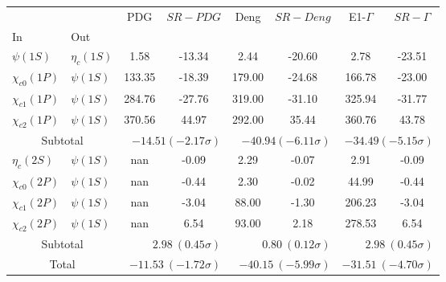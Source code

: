 \begin{tabular}{|l|l|c|c|c|c|c|c|}%
\hline%
&&PDG&$SR-PDG$&Deng&$SR-Deng$&E1-$\Gamma$&$SR-\Gamma$\\%
In&Out&&&&&&\\%
\hline%
$\psi(1S)$&$\eta_{c}(1S)$&1.58&-13.34&2.44&-20.60&2.78&-23.51\\%
$\chi_{c0}(1P)$&$\psi(1S)$&133.35&-18.39&179.00&-24.68&166.78&-23.00\\%
$\chi_{c1}(1P)$&$\psi(1S)$&284.76&-27.76&319.00&-31.10&325.94&-31.77\\%
$\chi_{c2}(1P)$&$\psi(1S)$&370.56&44.97&292.00&35.44&360.76&43.78\\%
\hline%
\hline%
\multicolumn{2}{|c|}{Subtotal}&\multicolumn{2}{|r|}{$-14.51 (-2.17\sigma)$}&\multicolumn{2}{|r|}{$-40.94 (-6.11\sigma)$}&\multicolumn{2}{|r|}{$-34.49 (-5.15\sigma)$}\\%
\hline%
\hline%
$\eta_{c}(2S)$&$\psi(1S)$&nan&-0.09&2.29&-0.07&2.91&-0.09\\%
$\chi_{c0}(2P)$&$\psi(1S)$&nan&-0.44&2.30&-0.02&44.99&-0.44\\%
$\chi_{c1}(2P)$&$\psi(1S)$&nan&-3.04&88.00&-1.30&206.23&-3.04\\%
$\chi_{c2}(2P)$&$\psi(1S)$&nan&6.54&93.00&2.18&278.53&6.54\\%
\hline%
\hline%
\multicolumn{2}{|c|}{Subtotal}&\multicolumn{2}{|r|}{$2.98~(0.45\sigma)$}&\multicolumn{2}{|r|}{$0.80~(0.12\sigma)$}&\multicolumn{2}{|r|}{$2.98~(0.45\sigma)$}\\%
\hline%
\hline%
\multicolumn{2}{|c|}{Total}&\multicolumn{2}{|r|}{$-11.53~(-1.72\sigma)$}&\multicolumn{2}{|r|}{$-40.15~(-5.99\sigma)$}&\multicolumn{2}{|r|}{$-31.51~(-4.70\sigma)$}\\%
\hline%
\end{tabular}